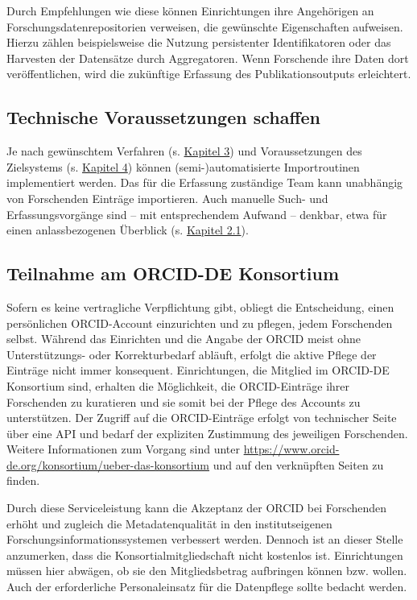 \documentclass[
  ngerman,
  letterpaper,
  DIV=11]{scrreprt}
\begin{document}
Durch Empfehlungen wie diese können Einrichtungen ihre Angehörigen an
Forschungsdatenrepositorien verweisen, die gewünschte Eigenschaften
aufweisen. Hierzu zählen beispielsweise die Nutzung persistenter
Identifikatoren oder das Harvesten der Datensätze durch Aggregatoren.
Wenn Forschende ihre Daten dort veröffentlichen, wird die zukünftige
Erfassung des Publikationsoutputs erleichtert.

\subsection{Technische Voraussetzungen
schaffen}\label{technische-voraussetzungen-schaffen}

Je nach gewünschtem Verfahren (s. \hyperref[durchfuxfchrung]{Kapitel 3})
und Voraussetzungen des Zielsystems (s. \hyperref[verwendung]{Kapitel
4}) können (semi-)automatisierte Importroutinen implementiert werden.
Das für die Erfassung zuständige Team kann unabhängig von Forschenden
Einträge importieren. Auch manuelle Such- und Erfassungsvorgänge sind --
mit entsprechendem Aufwand -- denkbar, etwa für einen anlassbezogenen
Überblick (s. \hyperref[ziele]{Kapitel 2.1}).

\subsection{Teilnahme am ORCID-DE
Konsortium}\label{teilnahme-am-orcid-de-konsortium}

Sofern es keine vertragliche Verpflichtung gibt, obliegt die
Entscheidung, einen persönlichen ORCID-Account einzurichten und zu
pflegen, jedem Forschenden selbst. Während das Einrichten und die Angabe
der ORCID meist ohne Unterstützungs- oder Korrekturbedarf abläuft,
erfolgt die aktive Pflege der Einträge nicht immer konsequent.
Einrichtungen, die Mitglied im ORCID-DE Konsortium sind, erhalten die
Möglichkeit, die ORCID-Einträge ihrer Forschenden zu kuratieren und sie
somit bei der Pflege des Accounts zu unterstützen. Der Zugriff auf die
ORCID-Einträge erfolgt von technischer Seite über eine API und bedarf
der expliziten Zustimmung des jeweiligen Forschenden. Weitere
Informationen zum Vorgang sind unter
\url{https://www.orcid-de.org/konsortium/ueber-das-konsortium} und auf
den verknüpften Seiten zu finden.

Durch diese Serviceleistung kann die Akzeptanz der ORCID bei Forschenden
erhöht und zugleich die Metadatenqualität in den institutseigenen
Forschungsinformationssystemen verbessert werden. Dennoch ist an dieser
Stelle anzumerken, dass die Konsortialmitgliedschaft nicht kostenlos
ist. Einrichtungen müssen hier abwägen, ob sie den Mitgliedsbetrag
aufbringen können bzw. wollen. Auch der erforderliche Personaleinsatz
für die Datenpflege sollte bedacht werden.
\end{document}
